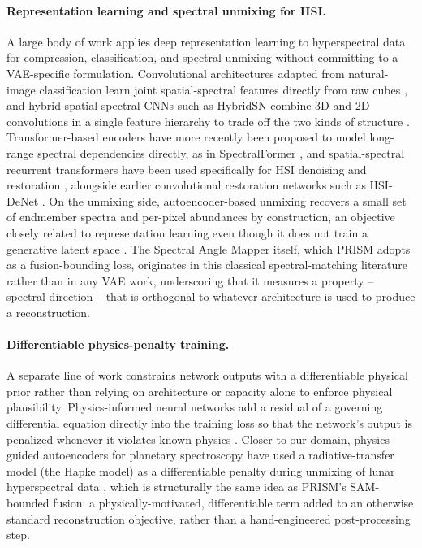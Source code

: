\documentclass{article} %
\begin{document}
\paragraph{Representation learning and spectral unmixing for HSI.} A large body of work applies deep representation learning to hyperspectral data for compression, classification, and spectral unmixing without committing to a VAE-specific formulation. Convolutional architectures adapted from natural-image classification learn joint spatial-spectral features directly from raw cubes \citep{chen2016deep}, and hybrid spatial-spectral CNNs such as HybridSN combine 3D and 2D convolutions in a single feature hierarchy to trade off the two kinds of structure \citep{roy2020hybridsn}. Transformer-based encoders have more recently been proposed to model long-range spectral dependencies directly, as in SpectralFormer \citep{hong2022spectralformer}, and spatial-spectral recurrent transformers have been used specifically for HSI denoising and restoration \citep{fu2024sst}, alongside earlier convolutional restoration networks such as HSI-DeNet \citep{chang2019hsidenet}. On the unmixing side, autoencoder-based unmixing recovers a small set of endmember spectra and per-pixel abundances by construction, an objective closely related to representation learning even though it does not train a generative latent space \citep{su2019daen, palsson2018unmixing}. The Spectral Angle Mapper itself, which PRISM adopts as a fusion-bounding loss, originates in this classical spectral-matching literature \citep{kruse1993sips} rather than in any VAE work, underscoring that it measures a property -- spectral direction -- that is orthogonal to whatever architecture is used to produce a reconstruction.

\paragraph{Differentiable physics-penalty training.} A separate line of work constrains network outputs with a differentiable physical prior rather than relying on architecture or capacity alone to enforce physical plausibility. Physics-informed neural networks add a residual of a governing differential equation directly into the training loss so that the network's output is penalized whenever it violates known physics \citep{raissi2019pinn}. Closer to our domain, physics-guided autoencoders for planetary spectroscopy have used a radiative-transfer model (the Hapke model) as a differentiable penalty during unmixing of lunar hyperspectral data \citep{lin2026hapke}, which is structurally the same idea as PRISM's SAM-bounded fusion: a physically-motivated, differentiable term added to an otherwise standard reconstruction objective, rather than a hand-engineered post-processing step.
\end{document}
